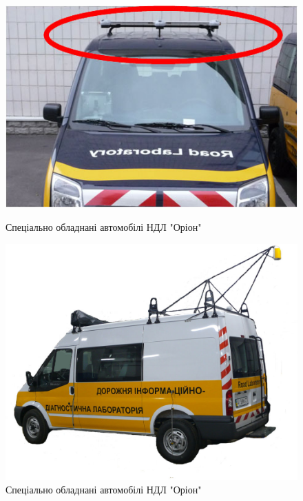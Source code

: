 \documentclass[simple,a4paper,14pt,ukrainian,utf8]{eskdtext}
\begin{document}
		\begin{figure}
			\centering \includegraphics[scale=0.75]{images/car_01.jpg}
			\caption{Спеціально обладнані автомобілі НДЛ "Оріон"}
			\vspace{2em}
			\centering \includegraphics[scale=0.35]{images/car_03.jpg}
			\caption{Спеціально обладнані автомобілі НДЛ "Оріон"}
		\end{figure}

		\clearpage \newpage
		
\end{document}
